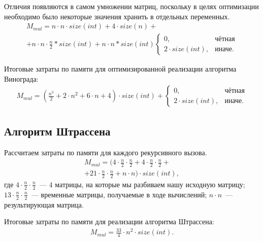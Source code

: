 Отличия появляются в самом умножении матриц, поскольку в целях оптимизации необходимо было некоторые значения хранить в отдельных переменных.
\begin{equation}
	\label{eq:mem_vinopt}
	\begin{gathered}
		M_{mul} = n \cdot n \cdot size(int) + 4 \cdot size(n) + \\ + n \cdot n \cdot \frac{n}{2} * size(int) + n \cdot n * size(int)
			\begin{cases}
				0, & \text{чётная} \\
				2 \cdot size(int), & \text{иначе}.
			\end{cases}
	\end{gathered}
\end{equation}

Итоговые затраты по памяти для оптимизированной реализации алгоритма Винограда:
\begin{equation}
	\label{eq:mem_vinopt_res}
	\begin{gathered}
		M_{mul} = (\frac{n^{3}}{2} + 2 \cdot n^{2} + 6 \cdot n + 4) \cdot size(int) +
		\begin{cases}
			0, & \text{чётная} \\
			2 \cdot size(int), & \text{иначе}.
		\end{cases}
	\end{gathered}
\end{equation}

\subsection*{Алгоритм Штрассена}
Рассчитаем затраты по памяти для каждого рекурсивного вызова.
\begin{equation}
	\label{eq:mem_stras}
	\begin{gathered}
		M_{mul} = (4 \cdot \frac{n}{2} \cdot \frac{n}{2} + 4 \cdot \frac{n}{2} \cdot \frac{n}{2} + \\ + 21 \cdot \frac{n}{2} \cdot \frac{n}{2} + n \cdot n) \cdot size(int),
	\end{gathered}
\end{equation}
где $4 \cdot \frac{n}{2} \cdot \frac{n}{2}$~--- 4 матрицы, на которые мы разбиваем нашу исходную матрицу;
\newline $13 \cdot \frac{n}{2} \cdot \frac{n}{2}$~--- временные матрицы, получаемые в ходе вычислений;
\newline $n \cdot n$~--- результирующая матрица.

Итоговые затраты по памяти для реализации алгоритма Штрассена:
\begin{equation}
	\label{eq:mem_stras_res}
	\begin{gathered}
		M_{mul} = \frac{33}{4} \cdot n^{2} \cdot size(int).
	\end{gathered}
\end{equation}

